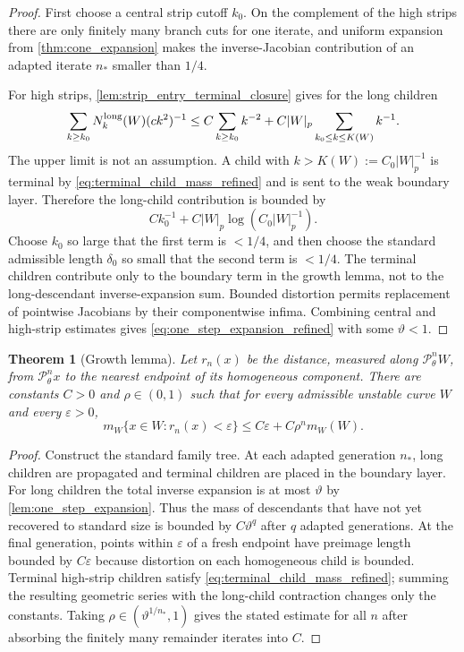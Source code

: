 \documentclass[12pt, letterpaper]{amsart}
\newcommand{\Pcal}{\mathcal{P}}
\theoremstyle{plain}
\newtheorem{theorem}{Theorem}[section]
\theoremstyle{definition}
\theoremstyle{remark}
\begin{document}
\begin{proof}
First choose a central strip cutoff $k_0$.  On the complement of the high strips
there are only finitely many branch cuts for one iterate, and uniform expansion
from \cref{thm:cone_expansion} makes the inverse-Jacobian contribution of an
adapted iterate $n_*$ smaller than $1/4$.

For high strips, \cref{lem:strip_entry_terminal_closure} gives for the long
children
\begin{equation}
    \sum_{k\ge k_0}N_k^{\rm long}(W)(ck^2)^{-1}
    \le C\sum_{k\ge k_0}k^{-2}
      +C|W|_p\sum_{k_0\le k\le K(W)}k^{-1} .
\end{equation}
The upper limit is not an assumption.  A child with
$k>K(W):=C_0|W|_p^{-1}$ is terminal by \eqref{eq:terminal_child_mass_refined}
and is sent to the weak boundary layer.  Therefore the long-child contribution
is bounded by
\begin{equation}
    Ck_0^{-1}+C|W|_p\log (C_0|W|_p^{-1}).
\end{equation}
Choose $k_0$ so large that the first term is $<1/4$, and then choose the
standard admissible length $\delta_0$ so small that the second term is $<1/4$.
The terminal children contribute only to the boundary term in the growth lemma,
not to the long-descendant inverse-expansion sum.  Bounded distortion permits
replacement of pointwise Jacobians by their componentwise infima.  Combining
central and high-strip estimates gives \eqref{eq:one_step_expansion_refined}
with some $\vartheta<1$.
\end{proof}

\begin{theorem}[Growth lemma]
\label{thm:growth_lemma}
Let $r_n(x)$ be the distance, measured along $\Pcal_\theta^nW$, from
$\Pcal_\theta^n x$ to the nearest endpoint of its homogeneous component.  There
are constants $C>0$ and $\rho\in(0,1)$ such that for every admissible unstable
curve $W$ and every $\varepsilon>0$,
\begin{equation}
    m_W\{x\in W:r_n(x)<\varepsilon\}
    \le C\varepsilon + C\rho^n m_W(W).
\end{equation}
\end{theorem}

\begin{proof}
Construct the standard family tree.  At each adapted generation $n_*$, long
children are propagated and terminal children are placed in the boundary layer.
For long children the total inverse expansion is at most $\vartheta$ by
\cref{lem:one_step_expansion}.  Thus the mass of descendants that have not yet
recovered to standard size is bounded by $C\vartheta^q$ after $q$ adapted
generations.  At the final generation, points within $\varepsilon$ of a fresh
endpoint have preimage length bounded by $C\varepsilon$ because distortion on
each homogeneous child is bounded.  Terminal high-strip children satisfy
\eqref{eq:terminal_child_mass_refined}; summing the resulting geometric series
with the long-child contraction changes only the constants.  Taking
$\rho\in(\vartheta^{1/n_*},1)$ gives the stated estimate for all $n$ after
absorbing the finitely many remainder iterates into $C$.
\end{proof}
\end{document}
